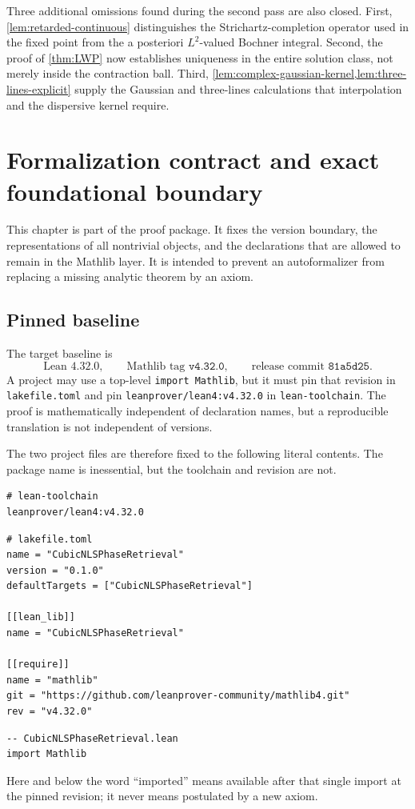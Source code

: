\documentclass[11pt,oneside]{book}
\theoremstyle{definition}
\theoremstyle{remark}
\newcommand{\1}{\mathbf 1}
\begin{document}
Three additional omissions found during the second pass are also closed.
First, \cref{lem:retarded-continuous} distinguishes the Strichartz-completion
operator used in the fixed point from the a posteriori $L^2$-valued Bochner
integral.  Second, the proof of \cref{thm:LWP} now establishes uniqueness in
the entire solution class, not merely inside the contraction ball.  Third,
\cref{lem:complex-gaussian-kernel,lem:three-lines-explicit} supply the
Gaussian and three-lines calculations that interpolation and the dispersive
kernel require.

\chapter{Formalization contract and exact foundational boundary}
\label{app:formalization-contract}

This chapter is part of the proof package.  It fixes the version boundary,
the representations of all nontrivial objects, and the declarations that are
allowed to remain in the Mathlib layer.  It is intended to prevent an
autoformalizer from replacing a missing analytic theorem by an axiom.

\section{Pinned baseline}

The target baseline is
\[
 \text{Lean }4.32.0,
 \qquad
 \text{Mathlib tag }\texttt{v4.32.0},
 \qquad
 \text{release commit }\texttt{81a5d25}.
\]
A project may use a top-level \texttt{import Mathlib}, but it must pin that
revision in \texttt{lakefile.toml} and pin
\texttt{leanprover/lean4:v4.32.0} in \texttt{lean-toolchain}.  The proof is
mathematically independent of declaration names, but a reproducible
translation is not independent of versions.

The two project files are therefore fixed to the following literal contents.
The package name is inessential, but the toolchain and revision are not.
\begin{verbatim}
# lean-toolchain
leanprover/lean4:v4.32.0
\end{verbatim}
\begin{verbatim}
# lakefile.toml
name = "CubicNLSPhaseRetrieval"
version = "0.1.0"
defaultTargets = ["CubicNLSPhaseRetrieval"]

[[lean_lib]]
name = "CubicNLSPhaseRetrieval"

[[require]]
name = "mathlib"
git = "https://github.com/leanprover-community/mathlib4.git"
rev = "v4.32.0"
\end{verbatim}
\begin{verbatim}
-- CubicNLSPhaseRetrieval.lean
import Mathlib
\end{verbatim}
Here and below the word ``imported'' means available after that single import
at the pinned revision; it never means postulated by a new axiom.
\end{document}
